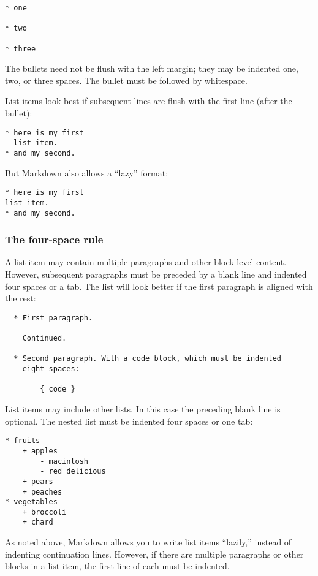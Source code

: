 \documentclass[]{article}
\begin{document}
\begin{verbatim}
* one

* two

* three
\end{verbatim}

The bullets need not be flush with the left margin; they may be indented
one, two, or three spaces. The bullet must be followed by whitespace.

List items look best if subsequent lines are flush with the first line
(after the bullet):

\begin{verbatim}
* here is my first
  list item.
* and my second.
\end{verbatim}

But Markdown also allows a ``lazy'' format:

\begin{verbatim}
* here is my first
list item.
* and my second.
\end{verbatim}

\subsubsection{The four-space rule}\label{the-four-space-rule}

A list item may contain multiple paragraphs and other block-level
content. However, subsequent paragraphs must be preceded by a blank line
and indented four spaces or a tab. The list will look better if the
first paragraph is aligned with the rest:

\begin{verbatim}
  * First paragraph.

    Continued.

  * Second paragraph. With a code block, which must be indented
    eight spaces:

        { code }
\end{verbatim}

List items may include other lists. In this case the preceding blank
line is optional. The nested list must be indented four spaces or one
tab:

\begin{verbatim}
* fruits
    + apples
        - macintosh
        - red delicious
    + pears
    + peaches
* vegetables
    + broccoli
    + chard
\end{verbatim}

As noted above, Markdown allows you to write list items ``lazily,''
instead of indenting continuation lines. However, if there are multiple
paragraphs or other blocks in a list item, the first line of each must
be indented.
\end{document}
